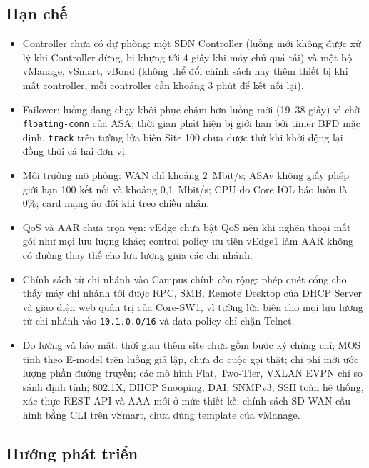 \subsection{Hạn chế}

\begin{itemize}
    \item Controller chưa có dự phòng: một SDN Controller (luồng mới không được xử lý khi Controller dừng, bị khựng tới 4 giây khi máy chủ quá tải) và một bộ vManage, vSmart, vBond (không thể đổi chính sách hay thêm thiết bị khi mất controller, mỗi controller cần khoảng 3 phút để kết nối lại).
    \item Failover: luồng đang chạy khôi phục chậm hơn luồng mới (19--38 giây) vì chờ \texttt{floating-conn} của ASA; thời gian phát hiện bị giới hạn bởi timer BFD mặc định. \texttt{track} trên tường lửa biên Site 100 chưa được thử khi khởi động lại đồng thời cả hai đơn vị.
    \item Môi trường mô phỏng: WAN chỉ khoảng 2~Mbit/s; ASAv không giấy phép giới hạn 100 kết nối và khoảng 0,1~Mbit/s; CPU do Core IOL báo luôn là 0\%; card mạng ảo đôi khi treo chiều nhận.
    \item QoS và AAR chưa trọn vẹn: vEdge chưa bật QoS nên khi nghẽn thoại mất gói như mọi lưu lượng khác; control policy ưu tiên vEdge1 làm AAR không có đường thay thế cho lưu lượng giữa các chi nhánh.
    \item Chính sách từ chi nhánh vào Campus chính còn rộng: phép quét cổng cho thấy máy chi nhánh tới được RPC, SMB, Remote Desktop của DHCP Server và giao diện web quản trị của Core-SW1, vì tường lửa biên cho mọi lưu lượng từ chi nhánh vào \texttt{10.1.0.0/16} và data policy chỉ chặn Telnet.
    \item Đo lường và bảo mật: thời gian thêm site chưa gồm bước ký chứng chỉ; MOS tính theo E-model trên luồng giả lập, chưa đo cuộc gọi thật; chi phí mới ước lượng phần đường truyền; các mô hình Flat, Two-Tier, VXLAN EVPN chỉ so sánh định tính; 802.1X, DHCP Snooping, DAI, SNMPv3, SSH toàn hệ thống, xác thực REST API và AAA mới ở mức thiết kế; chính sách SD-WAN cấu hình bằng CLI trên vSmart, chưa dùng template của vManage.
\end{itemize}

\subsection{Hướng phát triển}

